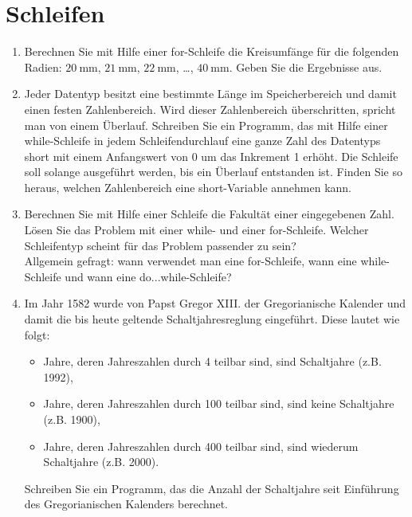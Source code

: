 \documentclass[paper=a4, fontsize=11pt, twoside]{scrartcl}
\begin{document}
\section*{Schleifen}
\begin{enumerate}[resume]
  \item Berechnen Sie mit Hilfe einer for-Schleife die Kreisumfänge für die folgenden Radien: $\SI{20}{\mm}$, $\SI{21}{\mm}$, $\SI{22}{\mm}$, \dots, $\SI{40}{\mm}$. Geben Sie die Ergebnisse aus.
  \item Jeder Datentyp besitzt eine bestimmte Länge im Speicherbereich und damit einen festen Zahlenbereich. Wird dieser Zahlenbereich überschritten, spricht man von einem Überlauf. Schreiben Sie ein Programm, das mit Hilfe einer while-Schleife in jedem Schleifendurchlauf eine ganze Zahl des Datentyps short mit einem Anfangswert von 0 um das Inkrement 1 erhöht. Die Schleife soll solange ausgeführt werden, bis ein Überlauf entstanden ist. Finden Sie so heraus, welchen Zahlenbereich eine short-Variable annehmen kann.
  \item Berechnen Sie mit Hilfe einer Schleife die Fakultät einer eingegebenen Zahl. Lösen Sie das Problem mit einer while- und einer for-Schleife. Welcher Schleifentyp scheint für das Problem passender zu sein?\\
  Allgemein gefragt: wann verwendet man eine for-Schleife, wann eine while-Schleife und wann eine do...while-Schleife?
 \item Im Jahr 1582 wurde von  Papst Gregor XIII. der Gregorianische Kalender und damit die bis heute geltende Schaltjahresreglung eingeführt. Diese lautet wie folgt:
   \begin{itemize}
   \item Jahre, deren Jahreszahlen durch 4 teilbar sind, sind Schaltjahre (z.B. 1992), 
   \item Jahre, deren Jahreszahlen durch 100 teilbar sind, sind keine Schaltjahre (z.B. 1900), 
   \item Jahre, deren Jahreszahlen durch 400 teilbar sind, sind wiederum Schaltjahre (z.B. 2000).
   \end{itemize}
   Schreiben Sie ein Programm, das die Anzahl der Schaltjahre seit Einführung des Gregorianischen Kalenders berechnet.
\end{enumerate}
\end{document}
